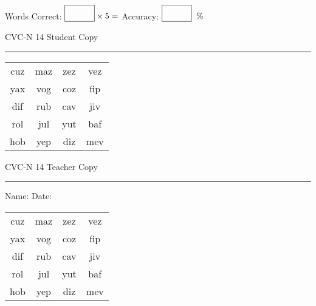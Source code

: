 \documentclass{memoir}
\begin{document}
\small

Words Correct: $\fbox{\phantom{\huge 100}} \times 5 = $ Accuracy: $\fbox{\phantom{\huge 100}}\;\; \%$ 

\vfill

\newpage


\footnotesize \noindent
CVC-N 14 \hfill Student Copy
\smallskip
\hrule

\Large

\setlength{\tabcolsep}{14pt}
\def\arraystretch{2}

{\selectfont


\begin{vplace}[0.5]
\begin{center}
\begin{tabular}{cccc}
cuz & maz & zez & vez \\
yax & vog & coz & fip \\
dif & rub & cav & jiv \\
rol & jul & yut & baf \\
hob & yep & diz & mev \\
\end{tabular}
\end{center}
\end{vplace}

}

\newpage

\footnotesize \noindent
CVC-N 14 \hfill Teacher Copy
\smallskip
\hrule

\small

\vfill

\noindent
Name: \underline{\hspace{1.75in}} \hfill Date: \underline{\hspace{1in}}

\Large

{\selectfont


\begin{vplace}[0.5]
\begin{center}
\begin{tabular}{cccc}
cuz & maz & zez & vez \\
yax & vog & coz & fip \\
dif & rub & cav & jiv \\
rol & jul & yut & baf \\
hob & yep & diz & mev \\
\end{tabular}
\end{center}
\end{vplace}



}
\end{document}
